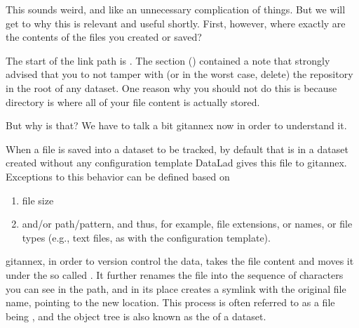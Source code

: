 \sphinxAtStartPar
This sounds weird, and like an unnecessary complication of things. But we will
get to why this is relevant and useful shortly. First, however,
where exactly are the contents of the files you created or saved?

\sphinxAtStartPar
The start of the link path is . The section {\hyperref[\detokenize{basics/101-101-create:createds}]{}} () contained
a note that strongly advised that you to not tamper with
(or in the worst case, delete) the 
repository in the root of any dataset. One reason
why you should not do this is because   directory is where all of your file content
is actually stored.

\sphinxAtStartPar
But why is that? We have to talk a bit git\sphinxhyphen{}annex now in order to understand it.

\sphinxAtStartPar
When a file is saved into a dataset to be tracked,
by default \textendash{} that is in a dataset created without any configuration template \textendash{}
DataLad gives this file to git\sphinxhyphen{}annex. Exceptions to this behavior can be
defined based on
\begin{enumerate}
%
\item {} 
\sphinxAtStartPar
file size

\item {} 
\sphinxAtStartPar
and/or path/pattern, and thus, for example, file extensions,
or names, or file types (e.g., text files, as with the
 configuration template).

\end{enumerate}

\sphinxAtStartPar
git\sphinxhyphen{}annex, in order to version control the data, takes the file content
and moves it under  \textendash{} the so called {\hyperref[\detokenize{glossary:term-object-tree}]{}}.
It further renames the file into the sequence of characters you can see
in the path, and in its place
creates a symlink with the original file name, pointing to the new location.
This process is often referred to as a file being , and the object
tree is also known as the  of a dataset.

